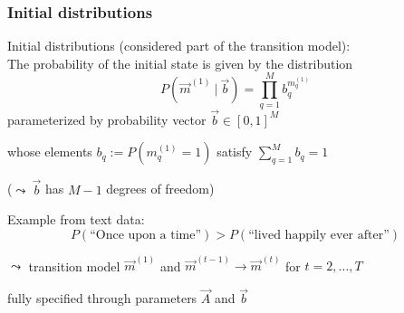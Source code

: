 \subsubsection{Initial distributions}
\label{sec:hmm_init}


\begin{frame}{\subsubsecname}

Initial distributions (considered part of the transition model):\\
The probability of the initial state is given by the distribution
\begin{equation}
P(\vec{m}^{(1)} ~|~ \vec{b}) = \prod_{q=1}^M b_q^{m_q^{(1)}}
\end{equation}
	parameterized by probability vector $\vec{b} \in [0, 1]^M$ 
	
	whose elements $b_q := P(m_q^{(1)} = 1)$ satisfy $\sum_{q=1}^M b_q = 1$

	($\leadsto ~ \vec{b}$ has $M-1$ degrees of freedom)
	
	\pause
	
	Example from text data:\\
	\begin{equation}
		P(\text{``}\text{Once upon a time}\text{''}) > P(\text{``}\text{lived happily ever after}\text{''})
	\end{equation}
	
	\svspace{5mm}
	
	$\leadsto$ transition model $\vec{m}^{(1)}$ and $\vec{m}^{(t-1)} \rightarrow \vec{m}^{(t)}$ for $t=2, \dots, T$
	
	\hspace{5mm} fully specified through parameters $\vec{A}$ and $\vec{b}$

\end{frame}


